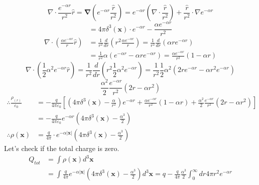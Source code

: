 \documentclass[letterpage]{article}
\begin{document}
\begin{equation*}
  \nabla \cdot \frac{e^{-\alpha r}}{r^2} \hat{r} = \boldsymbol{\nabla}
  \left(e^{-\alpha r} \frac{\hat{r}}{r^2} \right) = e^{-\alpha r} \left(\nabla
  \cdot \frac{\hat{r}}{r^2} \right) + \frac{\hat{r}}{r^2} \cdot \nabla e^{-\alpha r}
\end{equation*}
\begin{equation*}
  = 4\pi \delta ^3 (\textbf{x}) \cdot e^{-\alpha r} 
  - \frac{\alpha e ^{-\alpha r}}{r^2}
\end{equation*}
\begin{align*}
  \nabla \cdot \left(\frac{\alpha e^{-\alpha r}}{r} \hat{r} \right) 
  &= \frac{1}{r^2} \frac{d}{dr} \left(r^2 \frac{\alpha e^{-\alpha r}}{r} \right)
  = \frac{1}{r^2} \frac{d}{dr} \left(\alpha re^{-\alpha r} \right)\\
  &= \frac{1}{r^2} \alpha \left(e^{-\alpha r} -\alpha r e^{-\alpha r}\right)
  = \frac{\alpha e^{-\alpha r}}{r^2} (1-\alpha r)
\end{align*}
\begin{equation*}
  \nabla \cdot \left(\frac{1}{2} \alpha ^2 e^{-\alpha r} \hat{r}\right)
  =\frac{1}{r^2} \frac{d}{dr} \left(r^2 \frac{1}{2} \alpha ^2 e^{-\alpha r}
  \right)
  = \frac{1}{r^2} \frac{1}{2} \alpha ^2 \left(2r e^{-\alpha r} -\alpha r^2
  e^{-\alpha r}\right)
\end{equation*}
\begin{equation*}
  \frac{\alpha ^2}{2} \frac{e^{-\alpha r}}{r^2} (2r-\alpha r^2)
\end{equation*}
\begin{align*}
  \therefore \frac{\rho_{(r)}}{\varepsilon_0} &= -\frac{q}{4\pi \varepsilon_0}
  \left[ \left(4\pi \delta ^3 (\textbf{x}) - \frac{\alpha}{r^2} \right) 
  e^{-\alpha r} + \frac{\alpha e^ {-\alpha r}}{r^2} (1-\alpha r) + 
  \frac{\alpha ^2}{2} \frac{e^{-\alpha r}}{r^2} \left(2r - \alpha r^2 \right)
  \right]\\
  &= -\frac{q}{4\pi \varepsilon_0} e^{-\alpha r} \left( 4\pi \delta ^3 
  (\textbf{x}) -\frac{\alpha ^3}{2}  \right)\\
  \therefore \rho (\textbf{x}) &= \frac{q}{4\pi} \cdot e^{-\alpha |\textbf{x}|}
  \left(4\pi \delta ^3 (\textbf{x})-\frac{\alpha ^3}{2}\right)
\end{align*}
Let's check if the total charge is zero.
\begin{align*}
  Q_{tot} &= \int \rho (\textbf{x}) d^3 \textbf{x}\\
  &= \int \frac{q}{4 \pi} e^{-\alpha |\textbf{x}|} \left(4 \pi \delta ^3 
  (\textbf{x}) -\frac{\alpha ^3}{2}\right) d^3 \textbf{x} = q -\frac{q}{4 \pi} 
  \frac{\alpha ^3}{2} \int_0^\infty dr 4 \pi r^2 e^{-\alpha r}\\
\end{align*}
\end{document}

